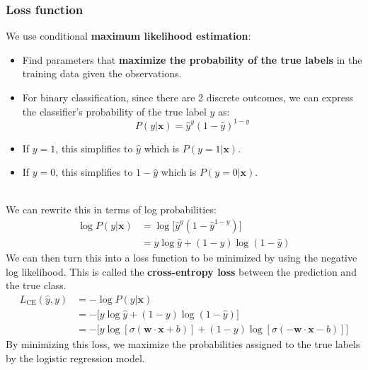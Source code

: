 \documentclass[11pt]{article}
\begin{document}
\subsubsection{Loss function}
We use conditional \textbf{maximum likelihood estimation}:
\begin{itemize}
    \item Find parameters that \textbf{maximize the probability of the true labels} in the training data given the observations.
    \item For binary classification, since there are 2 discrete outcomes, we can express the classifier's probability of the true label $y$ as:
$$
P(y|\mathbf{x})=\hat{y}^y(1-\hat{y})^{1-y}
$$
    \item If $y=1$, this simplifies to $\hat{y}$ which is $P(y=1|\mathbf{x})$.
    \item If $y=0$, this simplifies to $1-\hat{y}$ which is $P(y=0|\mathbf{x})$.
\end{itemize}
$\quad$\\[-1em]
We can rewrite this in terms of log probabilities:
\begin{align*}
    \log P(y|\mathbf{x})&=\log\big[\hat{y}^y(1-\hat{y}^{1-y})\big] \\
    &=y\log\hat{y}+(1-y)\log(1-\hat{y})
\end{align*}
We can then turn this into a loss function to be minimized by using the negative log likelihood. This is called the \textbf{cross-entropy loss} between the prediction and the true class.
\begin{align*}
    L_{\text{CE}}(\hat{y},y)&=-\log P(y|\mathbf{x}) \\
    &=-\big[y\log\hat{y}+(1-y)\log(1-\hat{y})\big] \\
    &=-\big[y\log[\sigma(\mathbf{w}\cdot\mathbf{x}+b)]+(1-y)\log[\sigma(-\mathbf{w}\cdot\mathbf{x}-b)]\big]
\end{align*}
By minimizing this loss, we maximize the probabilities assigned to the true labels by the logistic regression model.
\end{document}
